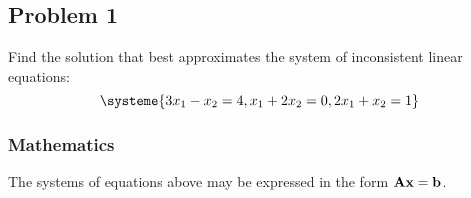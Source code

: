 \subsection{Problem 1}%
\label{sec:problem_1}
Find the solution that best approximates the system of inconsistent linear equations:
\begin{equation*}
    \systeme{3x_1-x_2=4,x_1+2x_2=0,2x_1+x_2=1}
\end{equation*}
\subsubsection*{Mathematics}
The systems of equations above may be expressed in the form $\mathbf{Ax}=\mathbf{b}$.
